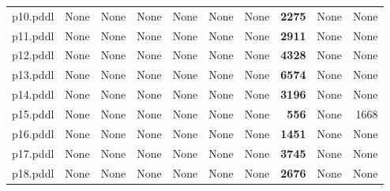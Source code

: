 \documentclass{article}
\begin{document}
\begin{tabular}{@{}lrrrrrrrrr@{}}
p10.pddl & \multicolumn{1}{|l|}{None} & \multicolumn{1}{|l|}{None} & \multicolumn{1}{|l|}{None} & \multicolumn{1}{|l|}{None} & \multicolumn{1}{|l|}{None} & \multicolumn{1}{|l|}{None} & \textbf{2275} & \multicolumn{1}{|l|}{None} & \multicolumn{1}{|l|}{None} \\
p11.pddl & \multicolumn{1}{|l|}{None} & \multicolumn{1}{|l|}{None} & \multicolumn{1}{|l|}{None} & \multicolumn{1}{|l|}{None} & \multicolumn{1}{|l|}{None} & \multicolumn{1}{|l|}{None} & \textbf{2911} & \multicolumn{1}{|l|}{None} & \multicolumn{1}{|l|}{None} \\
p12.pddl & \multicolumn{1}{|l|}{None} & \multicolumn{1}{|l|}{None} & \multicolumn{1}{|l|}{None} & \multicolumn{1}{|l|}{None} & \multicolumn{1}{|l|}{None} & \multicolumn{1}{|l|}{None} & \textbf{4328} & \multicolumn{1}{|l|}{None} & \multicolumn{1}{|l|}{None} \\
p13.pddl & \multicolumn{1}{|l|}{None} & \multicolumn{1}{|l|}{None} & \multicolumn{1}{|l|}{None} & \multicolumn{1}{|l|}{None} & \multicolumn{1}{|l|}{None} & \multicolumn{1}{|l|}{None} & \textbf{6574} & \multicolumn{1}{|l|}{None} & \multicolumn{1}{|l|}{None} \\
p14.pddl & \multicolumn{1}{|l|}{None} & \multicolumn{1}{|l|}{None} & \multicolumn{1}{|l|}{None} & \multicolumn{1}{|l|}{None} & \multicolumn{1}{|l|}{None} & \multicolumn{1}{|l|}{None} & \textbf{3196} & \multicolumn{1}{|l|}{None} & \multicolumn{1}{|l|}{None} \\
p15.pddl & \multicolumn{1}{|l|}{None} & \multicolumn{1}{|l|}{None} & \multicolumn{1}{|l|}{None} & \multicolumn{1}{|l|}{None} & \multicolumn{1}{|l|}{None} & \multicolumn{1}{|l|}{None} & \textbf{556} & \multicolumn{1}{|l|}{None} & 1668 \\
p16.pddl & \multicolumn{1}{|l|}{None} & \multicolumn{1}{|l|}{None} & \multicolumn{1}{|l|}{None} & \multicolumn{1}{|l|}{None} & \multicolumn{1}{|l|}{None} & \multicolumn{1}{|l|}{None} & \textbf{1451} & \multicolumn{1}{|l|}{None} & \multicolumn{1}{|l|}{None} \\
p17.pddl & \multicolumn{1}{|l|}{None} & \multicolumn{1}{|l|}{None} & \multicolumn{1}{|l|}{None} & \multicolumn{1}{|l|}{None} & \multicolumn{1}{|l|}{None} & \multicolumn{1}{|l|}{None} & \textbf{3745} & \multicolumn{1}{|l|}{None} & \multicolumn{1}{|l|}{None} \\
p18.pddl & \multicolumn{1}{|l|}{None} & \multicolumn{1}{|l|}{None} & \multicolumn{1}{|l|}{None} & \multicolumn{1}{|l|}{None} & \multicolumn{1}{|l|}{None} & \multicolumn{1}{|l|}{None} & \textbf{2676} & \multicolumn{1}{|l|}{None} & \multicolumn{1}{|l|}{None} \\

\end{tabular}
\end{document}
